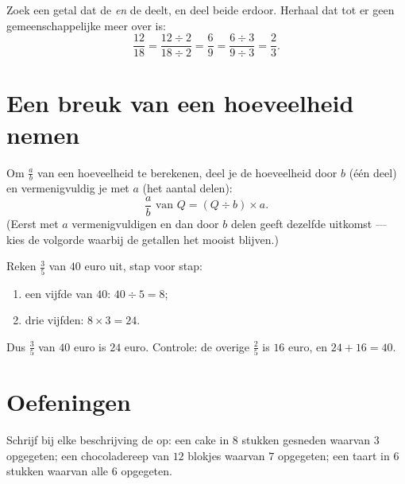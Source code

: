 \begin{method}\label{met:g6:fractions:simplify}
Zoek een getal dat de  \emph{en} de  deelt, en deel beide erdoor.
Herhaal dat tot er geen gemeenschappelijke  meer over is:
\[
\frac{12}{18} = \frac{12 \div 2}{18 \div 2} = \frac{6}{9}
= \frac{6 \div 3}{9 \div 3} = \frac{2}{3}.
\]
\end{method}

\section{Een breuk van een hoeveelheid nemen}

\begin{method}\label{met:g6:fractions:ofquantity}
Om $\frac ab$ van een hoeveelheid te berekenen, deel je de hoeveelheid door
$b$ (één deel) en vermenigvuldig je met $a$ (het aantal delen):
\[
\frac ab \text{ van } Q = (Q \div b) \times a .
\]
(Eerst met $a$ vermenigvuldigen en dan door $b$ delen geeft dezelfde uitkomst
--- kies de volgorde waarbij de getallen het mooist blijven.)
\end{method}

\begin{example}\label{ex:g6:fractions:ofquantity}
Reken $\frac35$ van $40$ euro uit, stap voor stap:
\begin{enumerate}
  \item een vijfde van $40$: $40 \div 5 = 8$;
  \item drie vijfden: $8 \times 3 = 24$.
\end{enumerate}
Dus $\frac35$ van $40$ euro is $24$ euro. Controle: de overige $\frac25$ is
$16$ euro, en $24 + 16 = 40$.
\end{example}

\section{Oefeningen}

\begin{exercise}[$\star$]\label{exo:g6:fractions:1}
Schrijf bij elke beschrijving de  op: een cake in $8$ stukken gesneden
waarvan $3$ opgegeten; een chocoladereep van $12$ blokjes waarvan $7$
opgegeten; een taart in $6$ stukken waarvan alle $6$ opgegeten.
\end{exercise}

